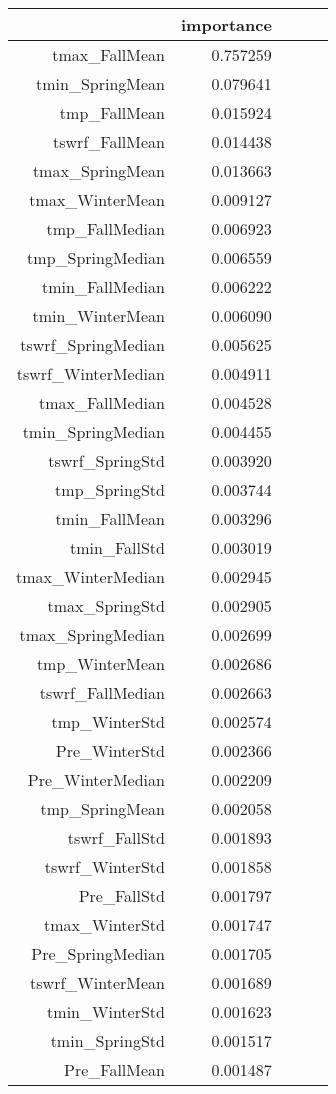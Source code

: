 \begin{tabular}{rrrrr}
\toprule
 & importance \\
\midrule
tmax_FallMean & 0.757259 \\
tmin_SpringMean & 0.079641 \\
tmp_FallMean & 0.015924 \\
tswrf_FallMean & 0.014438 \\
tmax_SpringMean & 0.013663 \\
tmax_WinterMean & 0.009127 \\
tmp_FallMedian & 0.006923 \\
tmp_SpringMedian & 0.006559 \\
tmin_FallMedian & 0.006222 \\
tmin_WinterMean & 0.006090 \\
tswrf_SpringMedian & 0.005625 \\
tswrf_WinterMedian & 0.004911 \\
tmax_FallMedian & 0.004528 \\
tmin_SpringMedian & 0.004455 \\
tswrf_SpringStd & 0.003920 \\
tmp_SpringStd & 0.003744 \\
tmin_FallMean & 0.003296 \\
tmin_FallStd & 0.003019 \\
tmax_WinterMedian & 0.002945 \\
tmax_SpringStd & 0.002905 \\
tmax_SpringMedian & 0.002699 \\
tmp_WinterMean & 0.002686 \\
tswrf_FallMedian & 0.002663 \\
tmp_WinterStd & 0.002574 \\
Pre_WinterStd & 0.002366 \\
Pre_WinterMedian & 0.002209 \\
tmp_SpringMean & 0.002058 \\
tswrf_FallStd & 0.001893 \\
tswrf_WinterStd & 0.001858 \\
Pre_FallStd & 0.001797 \\
tmax_WinterStd & 0.001747 \\
Pre_SpringMedian & 0.001705 \\
tswrf_WinterMean & 0.001689 \\
tmin_WinterStd & 0.001623 \\
tmin_SpringStd & 0.001517 \\
Pre_FallMean & 0.001487 \\

\end{tabular}
